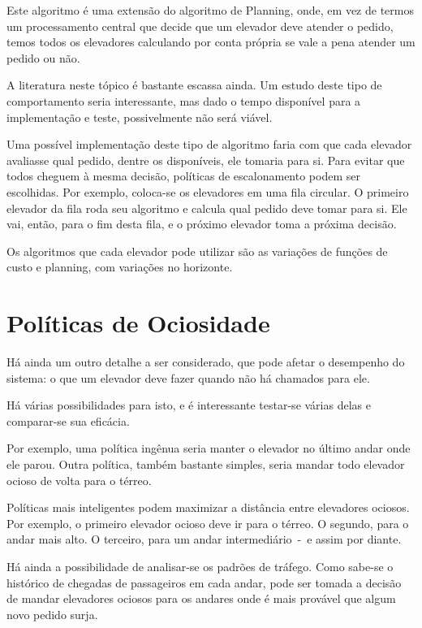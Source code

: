 Este algoritmo é uma extensão do algoritmo de Planning, onde, em vez de termos
um processamento central que decide que um elevador deve atender o pedido, temos
todos os elevadores calculando por conta própria se vale a pena atender um
pedido ou não.

A literatura neste tópico é bastante escassa ainda. Um estudo deste tipo de
comportamento seria interessante, mas dado o tempo disponível para a
implementação e teste, possivelmente não será viável.

Uma possível implementação deste tipo de algoritmo faria com que cada elevador
avaliasse qual pedido, dentre os disponíveis, ele tomaria para si. Para evitar
que todos cheguem à mesma decisão, políticas de escalonamento podem ser
escolhidas. Por exemplo, coloca-se os elevadores em uma fila circular. O
primeiro elevador da fila roda seu algoritmo e calcula qual pedido deve tomar
para si. Ele vai, então, para o fim desta fila, e o próximo elevador toma a
próxima decisão.

Os algoritmos que cada elevador pode utilizar são as variações de funções de
custo e planning, com variações no horizonte.

\section{Políticas de Ociosidade}

Há ainda um outro detalhe a ser considerado, que pode afetar o desempenho do
sistema: o que um elevador deve fazer quando não há chamados para ele.

Há várias possibilidades para isto, e é interessante testar-se várias delas e
comparar-se sua eficácia.

Por exemplo, uma política ingênua seria manter o elevador no último andar onde
ele parou. Outra política, também bastante simples, seria mandar todo elevador
ocioso de volta para o térreo.

Políticas mais inteligentes podem maximizar a distância entre elevadores
ociosos. Por exemplo, o primeiro elevador ocioso deve ir para o térreo. O
segundo, para o andar mais alto. O terceiro, para um andar intermediário~-~e
assim por diante.

Há ainda a possibilidade de analisar-se os padrões de tráfego. %
Como sabe-se o histórico de chegadas de passageiros em cada andar, pode ser
tomada a decisão de mandar elevadores ociosos para os andares onde é mais
provável que algum novo pedido surja.